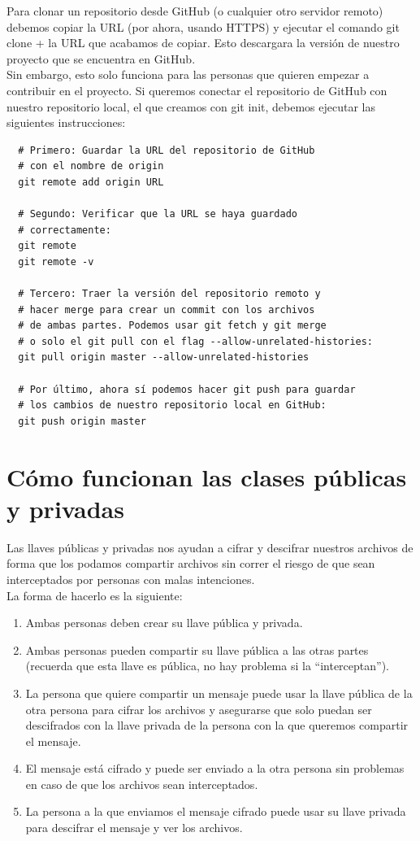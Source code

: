 \documentclass{article}
\begin{document}
Para clonar un repositorio desde GitHub (o cualquier otro servidor remoto)
debemos copiar la URL (por ahora, usando HTTPS) y ejecutar el comando git clone
+ la URL que acabamos de copiar. Esto descargara la versión de nuestro proyecto
que se encuentra en GitHub.\\

Sin embargo, esto solo funciona para las personas que quieren empezar a
contribuir en el proyecto. Si queremos conectar el repositorio de GitHub con
nuestro repositorio local, el que creamos con git init, debemos ejecutar las
siguientes instrucciones:\\


\begin{verbatim}
  # Primero: Guardar la URL del repositorio de GitHub
  # con el nombre de origin
  git remote add origin URL

  # Segundo: Verificar que la URL se haya guardado
  # correctamente:
  git remote
  git remote -v

  # Tercero: Traer la versión del repositorio remoto y
  # hacer merge para crear un commit con los archivos
  # de ambas partes. Podemos usar git fetch y git merge
  # o solo el git pull con el flag --allow-unrelated-histories:
  git pull origin master --allow-unrelated-histories

  # Por último, ahora sí podemos hacer git push para guardar
  # los cambios de nuestro repositorio local en GitHub:
  git push origin master
\end{verbatim}


\section{Cómo funcionan las clases públicas y privadas}%
Las llaves públicas y privadas nos ayudan a cifrar y descifrar nuestros
archivos de forma que los podamos compartir archivos sin correr el riesgo de
que sean interceptados por personas con malas intenciones.\\

La forma de hacerlo es la siguiente:

\begin{enumerate}
  \item Ambas personas deben crear su llave pública y privada.
  \item Ambas personas pueden compartir su llave pública a las otras partes
    (recuerda que esta llave es pública, no hay problema si la “interceptan”).
  \item La persona que quiere compartir un mensaje puede usar la llave pública
    de la otra persona para cifrar los archivos y asegurarse que solo puedan
    ser descifrados con la llave privada de la persona con la que queremos
    compartir el mensaje.
  \item El mensaje está cifrado y puede ser enviado a la otra persona sin
    problemas en caso de que los archivos sean interceptados.
  \item La persona a la que enviamos el mensaje cifrado puede usar su llave
    privada para descifrar el mensaje y ver los archivos.
\end{enumerate}
\end{document}
